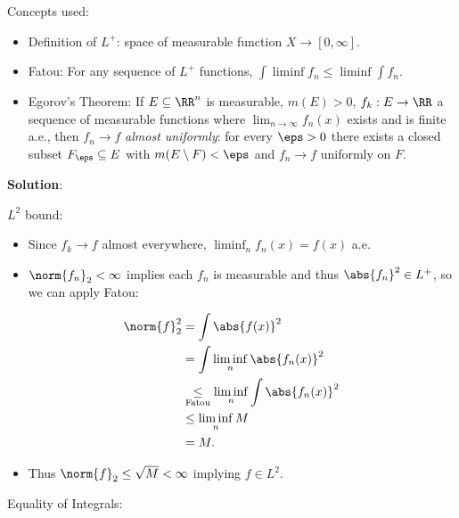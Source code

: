 \begin{solution}

Concepts used:

\begin{itemize}
\tightlist
\item
  Definition of \(L^+\): space of measurable function
  \(X\to [0, \infty]\).
\item
  Fatou: For any sequence of \(L^+\) functions,
  \(\int \liminf f_n \leq \liminf \int f_n\).
\item
  Egorov's Theorem: If \(E\subseteq \RR^n\) is measurable, \(m(E) > 0\),
  \(f_k:E\to \RR\) a sequence of measurable functions where
  \(\lim_{n\to\infty} f_n(x)\) exists and is finite a.e., then
  \(f_n\to f\) \emph{almost uniformly}: for every \(\eps>0\) there
  exists a closed subset \(F_\eps \subseteq E\) with
  \(m(E\setminus F) < \eps\) and \(f_n\to f\) uniformly on \(F\).
\end{itemize}

\textbf{Solution}:

\(L^2\) bound:

\begin{itemize}
\tightlist
\item
  Since \(f_k \to f\) almost everywhere, \(\liminf_n f_n(x) = f(x)\)
  a.e.
\item
  \(\norm{f_n}_2 < \infty\) implies each \(f_n\) is measurable and thus
  \(\abs{f_n}^2 \in L^+\), so we can apply Fatou:
\end{itemize}

\begin{align*}
\norm{f}_2^2
&= \int \abs{f(x)}^2  \\
&= \int \liminf_n \abs{f_n(x)}^2 \\
&\underset{\text{Fatou}}\leq\liminf_n \int \abs{f_n(x)}^2 \\
&\leq \liminf_n M \\
&= M
.\end{align*}

\begin{itemize}
\tightlist
\item
  Thus \(\norm{f}_2 \leq \sqrt{M} < \infty\) implying \(f\in L^2\).
\end{itemize}


Equality of Integrals:


\end{solution}
